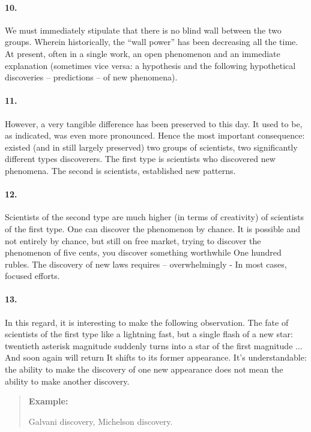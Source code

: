 \documentclass[11pt,a4paper]{article}
\newenvironment{example}{\begin{quote} \textbf{Example:}\par }{\end{quote}}
\begin{document}
\paragraph{10.}
We must immediately stipulate that there is no blind wall between the two
groups. Wherein historically, the “wall power” has been decreasing all the
time.  At present, often in a single work, an open phenomenon and an immediate
explanation (sometimes vice versa: a hypothesis and the following hypothetical
discoveries -- predictions -- of new phenomena).

\paragraph{11.}
However, a very tangible difference has been preserved to this day. It used to
be, as indicated, was even more pronounced. Hence the most important
consequence: existed (and in still largely preserved) two groups of
scientists, two significantly different types discoverers. The first type is
scientists who discovered new phenomena. The second is scientists, established
new patterns.

\paragraph{12.}
Scientists of the second type are much higher (in terms of creativity) of
scientists of the first type.  One can discover the phenomenon by chance. It
is possible and not entirely by chance, but still on free market, trying to
discover the phenomenon of five cents, you discover something worthwhile One
hundred rubles. The discovery of new laws requires -- overwhelmingly - In most
cases, focused efforts.

\paragraph{13.}
In this regard, it is interesting to make the following observation. The fate
of scientists of the first type like a lightning fast, but a single flash of a
new star: twentieth asterisk magnitude suddenly turns into a star of the first
magnitude ... And soon again will return It shifts to its former
appearance. It’s understandable: the ability to make the discovery of one new
appearance does not mean the ability to make another discovery.

\begin{example}
  Galvani discovery, Michelson discovery.
\end{example}
\end{document}
